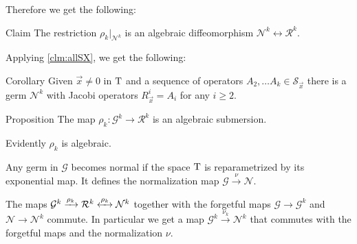 \documentclass[a4paper,10pt]{article}
\begin{document}
Therefore we get the following:


\begin{thm}{Claim}\label{clm:diff}
The restriction $\rho_k|_{\mathcal{N}^k}$ is an algebraic diffeomorphism $\mathcal{N}^k\leftrightarrow\mathcal{R}^k$.
\end{thm}

Applying \ref{clm:allSX}, we get the following:

\begin{thm}{Corollary}\label{cor:Rall}
Given $\vec x\ne 0$ in $\mathrm{T}$ and a sequence of operators $A_2,\dots A_k\in \mathcal{S}_\vec x$ there is a germ $\mathcal{N}^k$ with Jacobi operators $R^i_\vec x=A_i$ for any $i\ge 2$.
\end{thm}

\begin{thm}{Proposition}\label{prop:submersion}
The map $\rho_k:\mathcal{G}^k\to \mathcal{R}^k$ is an algebraic submersion.
\end{thm}

\begin{wrapfigure}{r}{34mm}
\vskip-4mm
\centering
{}
\label{diagram-page}
\end{wrapfigure}

Evidently $\rho_k$ is algebraic.

Any germ in $\mathcal{G}$ becomes normal if the space $\mathrm{T}$ is reparametrized by its exponential map.
It defines the normalization map 
$\mathcal{G}\xrightarrow{\nu} \mathcal{N}$.

The maps $\mathcal{G}^k\xrightarrow{\rho_k}\mathcal{R}^k\z{\xleftrightarrow{\rho_k}}\mathcal{N}^k$ together with the forgetful maps $\mathcal{G}\to\mathcal{G}^k$ and $\mathcal{N}\to\mathcal{N}^k$  commute.
In particular we get a map $\mathcal{G}^k\xrightarrow{\nu_k}\mathcal{N}^k$ that commutes with the forgetful maps and the normalization $\nu$.
\end{document}
